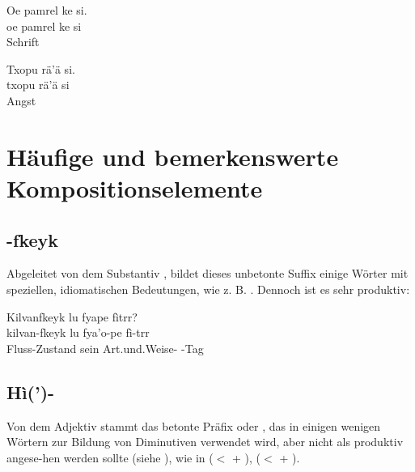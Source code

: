 \begin{interlin}
	\glll Oe pamrel ke si. \\
	oe pamrel ke si \\
	 Schrift   \\
\end{interlin}

\begin{interlin}
	\glll Txopu rä'ä si. \\
	txopu rä'ä si \\
	Angst   \\
\end{interlin}

\section{Häufige und bemerkenswerte Kompositionselemente}

\subsection{-fkeyk} Abgeleitet von dem Substantiv  , bildet dieses unbetonte Suffix einige Wörter mit speziellen, idiomatischen Bedeutungen, wie z. B.  . Dennoch ist es sehr produktiv: 

\begin{interlin}
	\glll \Npawl{}Kilvanfkeyk lu fyape fìtrr? \\
	kilvan-fkeyk lu fya'o-pe fì-trr \\
	Fluss-Zustand sein Art.und.Weise- -Tag \\
\end{interlin}

\subsection{Hì(')-} Von dem Adjektiv   stammt das betonte Präfix  oder , das in einigen wenigen Wörtern zur Bildung von Diminutiven verwendet wird, aber nicht als produktiv angese-hen werden sollte (siehe ), wie in   ($<$  +  ),   ($<$  +  ).

